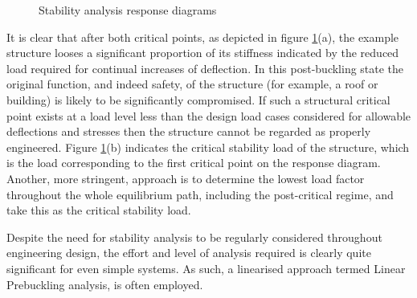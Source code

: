 \begin{figure}[H]
	\caption{\label{stab1}Stability analysis response diagrams \cite{FelippaStabilityBasics2016}}
\end{figure}

It is clear that after both critical points, as depicted in figure \ref{stab1}(a), the example structure looses a significant proportion of its stiffness indicated by the reduced load required for continual increases of deflection. In this post-buckling state the original function, and indeed safety, of the structure (for example, a roof or building) is likely to be significantly compromised. If such a structural critical point exists at a load level less than the design load cases considered for allowable deflections and stresses then the structure cannot be regarded as properly engineered. Figure \ref{stab1}(b) indicates the critical stability load of the structure, which is the load corresponding to the first critical point on the response diagram. Another, more stringent, approach is to determine the lowest load factor throughout the whole equilibrium path, including the post-critical regime, and take this as the critical stability load.

Despite the need for stability analysis to be regularly considered throughout engineering design, the effort and level of analysis required is clearly quite significant for even simple systems. As such, a linearised approach termed Linear Prebuckling analysis, is often employed.

